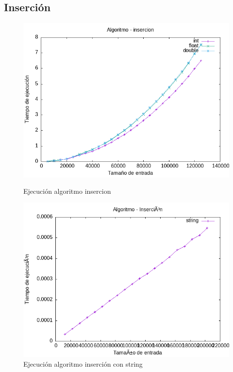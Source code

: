 \documentclass[11pt]{article}
\begin{document}
\subsection{Inserción}
\begin{figure}[H]
    \begin{minipage}{0.5\textwidth}
        \centering
        \includegraphics[width=\linewidth]{assets/Img/insercion.png}
        \caption{Ejecución algoritmo insercion}
        \label{fig:insercion}
    \end{minipage}%
    \begin{minipage}{0.5\textwidth}
        \centering
        \includegraphics[width=\linewidth]{assets/Img/insercionstring.png}
        \caption{Ejecución algoritmo inserción con string}
        \label{fig:insercionstring}
    \end{minipage}
\end{figure}
\end{document}
